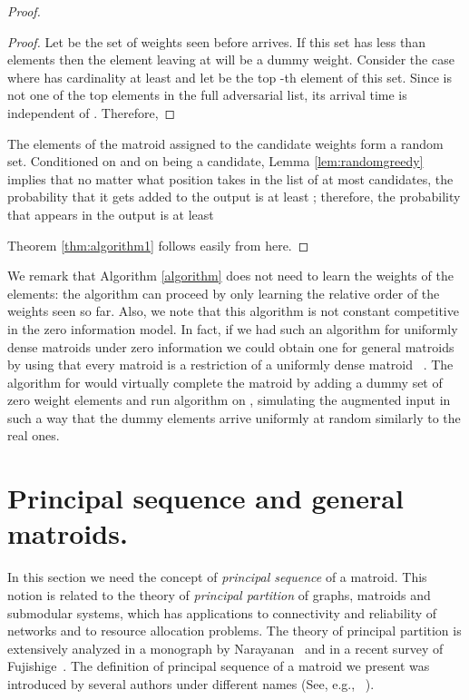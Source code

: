 \documentclass[letterpaper,11pt]{article}
\theoremstyle{definition}
\theoremstyle{remark}
\begin{document}
\begin{proof}
\begin{proof}
Let  be the set of weights seen before  arrives. If this set has less than  elements then the element leaving  at  will be a dummy weight. Consider the case where  has cardinality at least  and let  be the top -th element of this set. Since  is not one of the top  elements in the full adversarial list, its arrival time  is independent of . Therefore,

\end{proof}

The elements of the matroid assigned to the candidate weights form a random set. Conditioned on  and on  being a candidate, Lemma \ref{lem:randomgreedy} implies that no matter what position  takes in the list of at most  candidates, the probability that it gets added to the output is at least ; therefore, the probability that  appears in the output is at least

Theorem \ref{thm:algorithm1} follows easily from here.\qedhere
\end{proof}

We remark that Algorithm \ref{algorithm} does not need to learn the weights of the elements: the algorithm can proceed by only learning the relative order of the weights seen so far. Also, we note that this algorithm is not constant competitive in the zero information model. In fact, if we had such an algorithm  for uniformly dense matroids under zero information we could obtain one for general matroids by using that every matroid  is a restriction of a uniformly dense matroid ~\cite{lai1995every}. The algorithm for  would virtually complete the matroid  by adding a dummy set of zero weight elements and run algorithm  on , simulating the augmented input in such a way that the dummy elements arrive uniformly at random similarly to the real ones.

\section{Principal sequence and general matroids.}\label{section4}

In this section we  need the concept of \emph{principal sequence} of a matroid. This notion is related to the theory of \emph{principal partition} of graphs, matroids and submodular systems, which has applications to connectivity and reliability of networks and to resource allocation problems. The theory of principal partition is extensively analyzed in a monograph by Narayanan~\cite{narayanan1997submodular} and in a recent survey of Fujishige~\cite{fujishige2009theory}.
The definition of principal sequence of a matroid we present was introduced by several authors under different names (See, e.g., ~\cite{Narayanan74phd,tomizawa1976strongly,narayanan1981elementary}).
\end{document}
